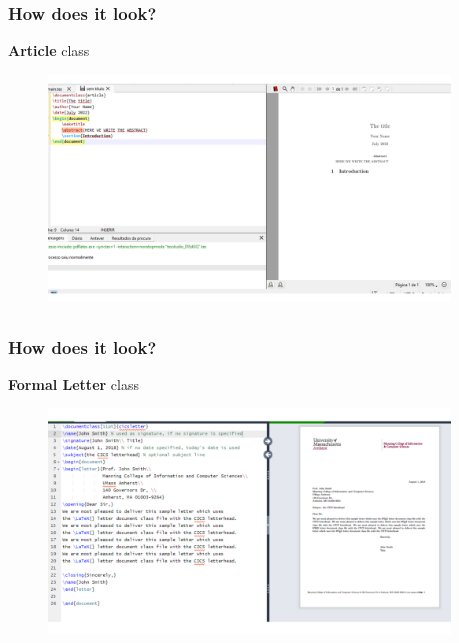 \documentclass{beamer}
\begin{document}
\begin{frame}
	\frametitle<presentation>{How does it \textbf{look}?}
	\begin{block}{\textbf{Article} class}
		\begin{figure}
		\centering
			\includegraphics[height=6cm]{figures/lookslike.pdf}
		\label{fig:texfile}
	\end{figure}
 	\end{block}
\end{frame}



\subsection*{}

\begin{frame}
	\frametitle<presentation>{How does it \textbf{look}?}
	\begin{block}{\textbf{Formal Letter} class}
		\begin{figure}
		\centering
			\includegraphics[height=6cm]{figures/lookslike2.pdf}
		\label{fig:texfile}
	\end{figure}
 	\end{block}
\end{frame}

\subsection*{}
\end{document}
